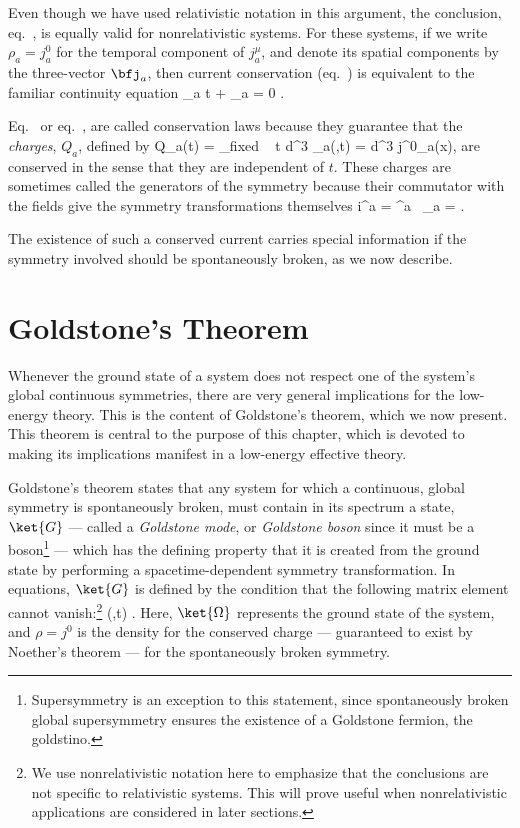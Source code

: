 \documentclass[12pt,epsf]{report}
\begin{document}
Even though we have used relativistic notation in this
argument, the  conclusion, eq.~, is
equally valid for nonrelativistic systems. For these
systems, if we write $\rho_a = 
j^0_a$ for the temporal component of $j^\mu_a$, and denote
its spatial components by the three-vector $\bfj_a$, then
current conservation (eq.~) is
equivalent to the familiar continuity equation
%
\eq
\label{noethersthm}
{ \partial \rho_a \over \partial t} + \nabla \cdot \bfj_a =
0 .
\eeq

Eq.~ or eq.~, are
called conservation laws because they guarantee that the
{\em charges}, $Q_a$, defined by
%
\eq
\label{chargint}
Q_a(t) = \int_{{\rm fixed} ~ t} d^3\bfr \; \rho_a(\bfr,t) =
\int d^3\bfr \;
j^0_a(x),
\eeq
%
are conserved in the sense that they are independent of
$t$. These charges are sometimes called the generators of
the symmetry because their commutator with the fields give
the symmetry transformations themselves  
%
\eq
\label{gencondition}
i\omega^a \; [Q_a, \phi(x) ] = \omega^a \, \xi_a = \delta
\phi.
\eeq

The existence of such a conserved current carries special
information if the symmetry involved should be
spontaneously broken, as we now describe.

\section{Goldstone's Theorem}

Whenever the ground state of a system does not respect one
of the system's global continuous symmetries, there are
very general implications for the low-energy theory. This
is the content of Goldstone's theorem, which we now
present. This theorem is central to the purpose of this
chapter, which is devoted to making its implications
manifest in a low-energy effective theory.

Goldstone's theorem states that any system for which a
continuous, global symmetry is spontaneously broken, must
contain in its spectrum a state, $\ket{G} $ --- called a
{\em Goldstone mode}, or {\em Goldstone boson} since it
must be a boson\footnote{Supersymmetry is an exception to
this statement, since spontaneously broken global
supersymmetry ensures the existence of a Goldstone fermion,
the goldstino.} --- which has the defining property that it
is created from the ground state by performing a
spacetime-dependent symmetry transformation. In equations,
$\ket{G}$ is defined by the condition that the following
matrix element cannot vanish:\footnote{We use
nonrelativistic notation here to emphasize that the
conclusions are not specific to relativistic systems. This
will prove useful when nonrelativistic applications are
considered in later sections.}
%
\eq
\label{gbdefn}
 \rho(\bfr,t) \ket{\Omega}  . \eeq
%
Here, $\ket{\Omega}$ represents the ground state of the
system, and $\rho = j^0$ is the density for the conserved
charge --- guaranteed to exist by Noether's theorem --- for
the spontaneously broken symmetry. 
\end{document}
